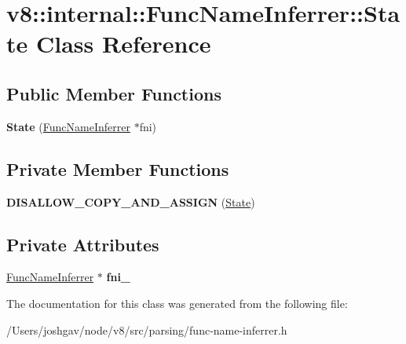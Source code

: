 \hypertarget{classv8_1_1internal_1_1_func_name_inferrer_1_1_state}{}\section{v8\+:\+:internal\+:\+:Func\+Name\+Inferrer\+:\+:State Class Reference}
\label{classv8_1_1internal_1_1_func_name_inferrer_1_1_state}
\subsection*{Public Member Functions}
\begin{DoxyCompactItemize}
\item 
{\bfseries State} (\hyperlink{classv8_1_1internal_1_1_func_name_inferrer}{Func\+Name\+Inferrer} $\ast$fni)\hypertarget{classv8_1_1internal_1_1_func_name_inferrer_1_1_state_ac12d14d123fcc1b29f276b52337d6b53}{}\label{classv8_1_1internal_1_1_func_name_inferrer_1_1_state_ac12d14d123fcc1b29f276b52337d6b53}

\end{DoxyCompactItemize}
\subsection*{Private Member Functions}
\begin{DoxyCompactItemize}
\item 
{\bfseries D\+I\+S\+A\+L\+L\+O\+W\+\_\+\+C\+O\+P\+Y\+\_\+\+A\+N\+D\+\_\+\+A\+S\+S\+I\+GN} (\hyperlink{classv8_1_1internal_1_1_func_name_inferrer_1_1_state}{State})\hypertarget{classv8_1_1internal_1_1_func_name_inferrer_1_1_state_ad40dab83c3d06e974390a4fbcc665e5e}{}\label{classv8_1_1internal_1_1_func_name_inferrer_1_1_state_ad40dab83c3d06e974390a4fbcc665e5e}

\end{DoxyCompactItemize}
\subsection*{Private Attributes}
\begin{DoxyCompactItemize}
\item 
\hyperlink{classv8_1_1internal_1_1_func_name_inferrer}{Func\+Name\+Inferrer} $\ast$ {\bfseries fni\+\_\+}\hypertarget{classv8_1_1internal_1_1_func_name_inferrer_1_1_state_af98944a668838b2a4a4f0577b4af1304}{}\label{classv8_1_1internal_1_1_func_name_inferrer_1_1_state_af98944a668838b2a4a4f0577b4af1304}

\end{DoxyCompactItemize}


The documentation for this class was generated from the following file\+:\begin{DoxyCompactItemize}
\item 
/\+Users/joshgav/node/v8/src/parsing/func-\/name-\/inferrer.\+h\end{DoxyCompactItemize}

